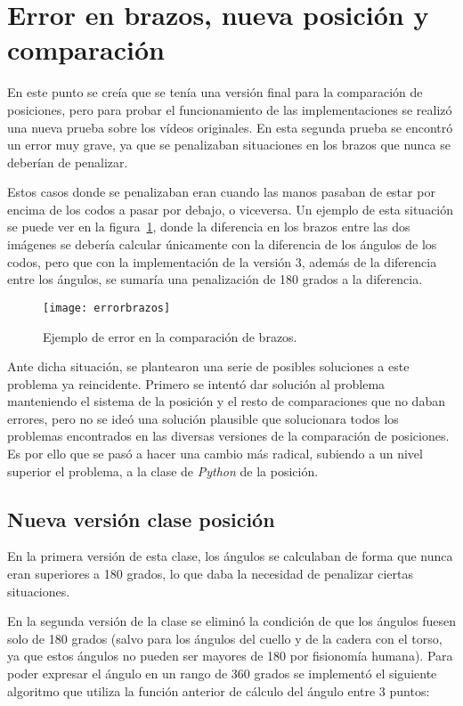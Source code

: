 {\section{Error en brazos, nueva posición y comparación}
En este punto se creía que se tenía una versión final para la comparación de posiciones, pero para probar el funcionamiento de las implementaciones se realizó una nueva prueba sobre los vídeos originales. En esta segunda prueba se encontró un error muy grave, ya que se penalizaban situaciones en los brazos que nunca se deberían de penalizar.

Estos casos donde se penalizaban eran cuando las manos pasaban de estar por encima de los codos a pasar por debajo, o viceversa. Un ejemplo de esta situación se puede ver en la figura~\ref{fig:errorbrazos}, donde la diferencia en los brazos entre las dos imágenes se debería calcular únicamente con la diferencia de los ángulos de los codos, pero que con la implementación de la versión 3, además de la diferencia entre los ángulos, se sumaría una penalización de 180 grados a la diferencia.

\begin{figure}[h]
	\centering
	\texttt{[image: errorbrazos]}
	\caption{Ejemplo de error en la comparación de brazos.}
	\label{fig:errorbrazos}
\end{figure}

Ante dicha situación, se plantearon una serie de posibles soluciones a este problema ya reincidente. Primero se intentó dar solución al problema manteniendo el sistema de la posición y el resto de comparaciones que no daban errores, pero no se ideó una solución plausible que solucionara todos los problemas encontrados en las diversas versiones de la comparación de posiciones. Es por ello que se pasó a hacer una cambio más radical, subiendo a un nivel superior el problema, a la clase de \textit{Python} de la posición.

\subsection{Nueva versión clase posición}

En la primera versión de esta clase, los ángulos se calculaban de forma que nunca eran superiores a 180 grados, lo que daba la necesidad de penalizar ciertas situaciones.

En la segunda versión de la clase se eliminó la condición de que los ángulos fuesen solo de 180 grados (salvo para los ángulos del cuello y de la cadera con el torso, ya que estos ángulos no pueden ser mayores de 180 por fisionomía humana). Para poder expresar el ángulo en un rango de 360 grados se implementó el siguiente algoritmo que utiliza la función anterior de cálculo del ángulo entre 3 puntos:

}
